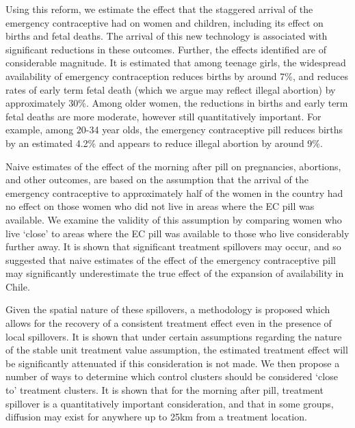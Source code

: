 Using this reform, we estimate the effect that the staggered arrival of the 
emergency contraceptive had on women and children, including its effect on births 
and fetal deaths. The arrival of this new technology is associated with significant 
reductions in these outcomes.  Further, the effects identified are of considerable
magnitude.  It is estimated that among teenage girls, the widespread availability 
of emergency contraception reduces births by around 7\%, and reduces rates of early
term fetal death (which we argue may reflect illegal abortion) by approximately 30\%. 
Among older women, the reductions in births and early term fetal deaths are more 
moderate, however still quantitatively important.  For example, among 20-34 year 
olds, the emergency contraceptive pill reduces births by an estimated 4.2\% and 
appears to reduce illegal abortion by around 9\%.

\nocite{Goldin2006, Bailey2011}
\nocite{KearnerLevine2009}
\nocite{Ananatetal2007,ThomasDouglas1996,Levineetal1996}

Naive estimates of the effect of the morning after pill on pregnancies, abortions, 
and other outcomes, are based on the assumption that the arrival of the emergency 
contraceptive to approximately half of the women in the country had no effect on 
those women who did not live in areas where the EC pill was available.  We examine 
the validity of this assumption by comparing women who live `close' to areas where 
the EC pill was available to those who live considerably further away.  It is shown 
that significant treatment spillovers may occur, and so suggested that naive 
estimates of the effect of the emergency contraceptive pill may significantly 
underestimate the true effect of the expansion of availability in Chile.

Given the spatial nature of these spillovers, a methodology is proposed which
allows for the recovery of a consistent treatment effect even in the presence
of local spillovers.  It is shown that under certain assumptions regarding the
nature of the stable unit treatment value assumption, the estimated treatment 
effect will be significantly attenuated if this consideration is not made.
We then propose a number of ways to determine which control clusters should
be considered `close to' treatment clusters.  It is shown that for the morning
after pill, treatment spillover is a quantitatively important consideration,
and that in some groups, diffusion may exist for anywhere up to 25km from a
treatment location.


